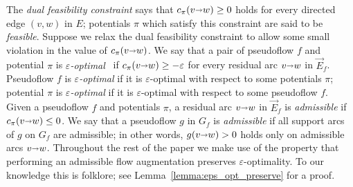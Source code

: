 \documentclass[a4paper,UKenglish]{socg-lipics-v2018}
\makeatletter
\def\eps{\varepsilon}
\def\arcto{\mathord\shortrightarrow}
\def\arc#1#2{#1\arcto#2}
\theoremstyle{plain}
\numberwithin{figure}{section}
\def\EMPH#1{\textcolor{BrickRed}{{\emph{#1}}}}
\def\n@te#1{\textsf{\boldmath \textbf{$\langle\!\langle$#1$\rangle\!\rangle$}}\leavevmode}
\def\note#1{\textcolor{red}{\n@te{#1}}}
\renewcommand{\note}[1]{} %
\makeatother
\begin{document}
The \EMPH{dual feasibility constraint} says that $c_\pi(\arc vw) \geq 0$ holds for every directed edge $(v,w)$ in $E$; potentials $\pi$ which satisfy this constraint are said to be \EMPH{feasible}.
%
%
Suppose we relax the dual feasibility constraint to allow some small violation in the value of $c_\pi(\arc vw)$.
We say that a pair of pseudoflow $f$ and potential $\pi$ is
\EMPH{$\eps$-optimal}~\cite{T85,BE87} if $c_\pi(\arc vw) \geq -\eps$ for every
residual arc $\arc vw$ in $\vec{E}_f$.
Pseudoflow $f$ is \emph{$\eps$-optimal} if it is $\eps$-optimal with respect to
some potentials $\pi$; potential $\pi$ is \emph{$\eps$-optimal} if it is
$\eps$-optimal with respect to some pseudoflow $f$.
%
Given a pseudoflow $f$ and potentials $\pi$, a residual arc $\arc vw$ in $\vec{E}_f$ is
\EMPH{admissible} if $c_\pi(\arc vw) \leq 0$.
We say that a pseudoflow $g$ in $G_f$ is \EMPH{admissible} if all support arcs of $g$ on $G_f$ are admissible; in other words, $g(\arc vw) > 0$ holds only on admissible arcs $\arc vw$.
%
Throughout the rest of the paper we make use of the property that performing
an admissible flow augmentation preserves $\eps$-optimality.
To our knowledge this is folklore;
see Lemma~\ref{lemma:eps_opt_preserve} for a proof.
\end{document}
